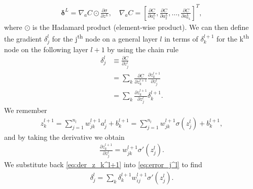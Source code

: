 \begin{align*}
    \boldsymbol{\delta}^L = \nabla_a C \odot \frac{\partial \sigma}{\partial z^L}, \quad  \nabla_a C = \left[\frac{\partial C}{\partial a_1^L}, \frac{\partial C}{\partial a_2^L}, \hdots, \frac{\partial C}{\partial a_{n_L}^L}\right]^T,
\end{align*}
where $\odot$ is the Hadamard product (element-wise product). We can then define the gradient $\delta_j^l$ for the j\textsuperscript{th} node on a general layer $l$ in terms of $\delta_k^{l+1}$ for the k\textsuperscript{th} node on the following layer $l+1$ by using the chain rule
\begin{align}
    \delta_j^l &\equiv \frac{\partial C}{\partial z_j^l} \nonumber \\
    &= \sum_k \frac{\partial C}{\partial z_k^{l+1}}\frac{\partial z_k^{l+1}}{\partial z_j^l} \nonumber\\
    &= \sum_k \frac{\partial z_k^{l+1}}{\partial z_j^l} \delta_k^{l+1}.
    \label{eq:error_j^l}
\end{align}
We remember 
\begin{align*}
    z_k^{l+1} = \sum_{j = 1}^{n_l} w_{jk}^{l+1} a_j^l + b_k^{l+1} = \sum_{j = 1}^{n_l} w_{jk}^{l+1} \sigma(z_j^l) + b_k^{l+1},
\end{align*}
and by taking the derivative we obtain
\begin{align}
    \frac{\partial z_k^{l+1}}{\partial z_j^l} =  w_{jk}^{l+1} \sigma'(z_j^l).
    \label{eq:der_z_k^l+1}
\end{align}
We substitute back \ref{eq:der_z_k^l+1} into \ref{eq:error_j^l} to find
\begin{align*}
    \delta_j^l = \sum_k  \delta_k^{l+1}  w_{ij}^{l+1}\sigma'(z_j^l).
\end{align*}

